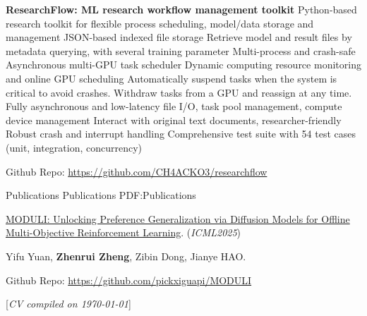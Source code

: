 \documentclass[letterpaper,MMMyyyy,nonstopmode]{simpleresumecv}
\newcommand{\CVNote}{CV compiled on {\today}}
\begin{document}
\begin{Body}
\BigGap
\Entry
\textbf{ResearchFlow: ML research workflow management toolkit}
\hfill
{}
\newline
Python-based research toolkit for flexible process scheduling, model/data storage and management
\Gap
\BulletItem
JSON-based indexed file storage
\SubBulletItem
Retrieve model and result files by metadata querying, with several training parameter
\SubBulletItem
Multi-process and crash-safe
\BulletItem
Asynchronous multi-GPU task scheduler
\SubBulletItem
Dynamic computing resource monitoring and online GPU scheduling
\SubSubBulletItem
Automatically suspend tasks when the system is critical to avoid crashes.
\SubSubBulletItem
Withdraw tasks from a GPU and reassign at any time.
\SubSubBulletItem
Fully asynchronous and low-latency file I/O, task pool management, compute device management
\SubBulletItem
Interact with original text documents, researcher-friendly
\SubBulletItem
Robust crash and interrupt handling
\SubBulletItem
Comprehensive test suite with 54 test cases (unit, integration, concurrency)

Github Repo: \url{https://github.com/CH4ACKO3/researchflow}

\Section
{Publications}
{Publications}
{PDF:Publications}

\Entry
\href{https://arxiv.org/abs/2408.15501}{MODULI: Unlocking Preference Generalization via Diffusion Models for Offline Multi-Objective Reinforcement Learning}. (\textit{ICML2025})

Yifu Yuan, \textbf{Zhenrui Zheng}, Zibin Dong, Jianye HAO.

Github Repo: \url{https://github.com/pickxiguapi/MODULI}

\end{Body}


\BigGap
\UseNoteFont%
\null\hfill%
[\textit{\CVNote}]
\end{document}
